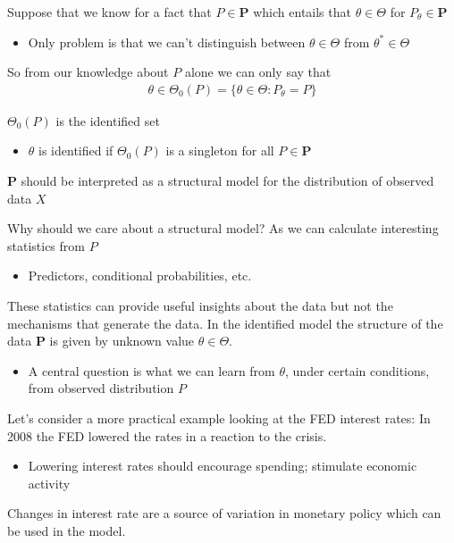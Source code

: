 \documentclass{beamer}
\begin{document}
\begin{frame}
  Suppose that we know for a fact that $P \in \mathbf{P}$ which entails that $\theta \in \Theta$ for $P_{\theta} \in \mathbf{P}$
  \begin{itemize}
    \item Only problem is that we can't distinguish between $\theta \in \Theta$ from $\theta^* \in \Theta$
  \end{itemize}
  \medskip
  So from our knowledge about $P$ alone we can only say that 
  \begin{align}
    \theta \in \Theta_0(P)= \{\theta \in \Theta: P_{\theta} = P\}
  \end{align}  
\end{frame}

\begin{frame}
  $\Theta_0(P)$ is the identified set
  \begin{itemize}
    \item $\theta$ is identified if $\Theta_0 (P)$ is a singleton for all $P \in \mathbf{P}$
  \end{itemize} 
  \medskip
  $\mathbf{P}$ should be interpreted as a structural model for the distribution of observed data $X$
\end{frame}

\begin{frame}
  Why should we care about a structural model? As we can calculate interesting statistics from $P$
  \begin{itemize}
    \item Predictors, conditional probabilities, etc.    
  \end{itemize}
  \medskip
  These statistics can provide useful insights about the data but not the mechanisms that generate the data.
  In the identified model the structure of the data $\mathbf{P}$ is given by unknown value $\theta \in \Theta$.
  \begin{itemize}
    \item A central question is what we can learn from $\theta$, under certain conditions, from observed distribution $P$
  \end{itemize}
\end{frame}

\begin{frame}
  Let's consider a more practical example looking at the FED interest rates:
  In 2008 the FED lowered the rates in a reaction to the crisis.
  \begin{itemize}
    \item Lowering interest rates should encourage spending; stimulate economic activity
  \end{itemize}
  \medskip
  Changes in interest rate are a source of variation in monetary policy which can be used in the model. 
\end{frame}
\end{document}
